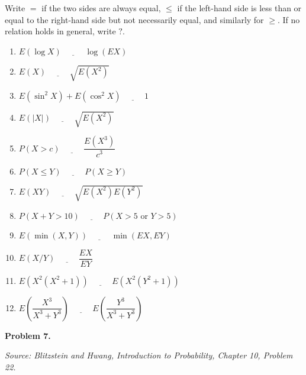 \documentclass[11pt]{article}
\newcommand{\source}[2]{%
    \vspace{0.15cm}
    {\small\textit{Source: Blitzstein and Hwang, \textit{Introduction to Probability}, Chapter #1, Problem #2.}}
}
\begin{document}
Write $=$ if the two sides are always equal, $\le$ if the left-hand side is less than or equal to the right-hand side but not necessarily equal, and similarly for $\ge$. If no relation holds in general, write $?$.

\begin{enumerate}[label=(\alph*), leftmargin=*]
    \item $E(\log X)\ \underline{\hspace{1cm}}\ \log(E X)$
    \item $E(X)\ \underline{\hspace{1cm}}\ \sqrt{E(X^2)}$
    \item $E(\sin^2 X)+E(\cos^2 X)\ \underline{\hspace{1cm}}\ 1$
    \item $E(|X|)\ \underline{\hspace{1cm}}\ \sqrt{E(X^2)}$
    \item $P(X>c)\ \underline{\hspace{1cm}}\ \dfrac{E(X^3)}{c^3}$
    \item $P(X\le Y)\ \underline{\hspace{1cm}}\ P(X\ge Y)$
    \item $E(XY)\ \underline{\hspace{1cm}}\ \sqrt{E(X^2)E(Y^2)}$
    \item $P(X+Y>10)\ \underline{\hspace{1cm}}\ P(X>5\text{ or }Y>5)$
    \item $E(\min(X,Y))\ \underline{\hspace{1cm}}\ \min(EX,EY)$
    \item $E(X/Y)\ \underline{\hspace{1cm}}\ \dfrac{EX}{EY}$
    \item $E\!\left(X^2(X^2+1)\right)\ \underline{\hspace{1cm}}\ E\!\left(X^2(Y^2+1)\right)$
    \item $E\!\left(\dfrac{X^3}{X^3+Y^3}\right)\ \underline{\hspace{1cm}}\ E\!\left(\dfrac{Y^3}{X^3+Y^3}\right)$
\end{enumerate}
 
\newpage

 


\begin{problemheader}
\textbf{Problem 7.}
\end{problemheader}
\source{10}{22}
\end{document}
